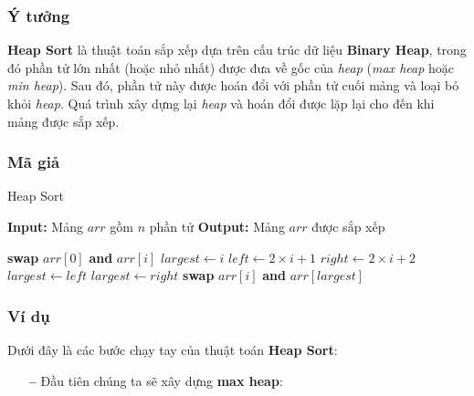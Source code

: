 \subsubsection{Ý tưởng}
\textbf{Heap Sort} là thuật toán sắp xếp dựa trên cấu trúc dữ liệu \textbf{Binary Heap}, trong đó phần tử lớn nhất (hoặc nhỏ nhất) được đưa về gốc của \textit{heap} (\textit{max heap} hoặc \textit{min heap}). Sau đó, phần tử này được hoán đổi với phần tử cuối mảng và loại bỏ khỏi \textit{heap}. Quá trình xây dựng lại \textit{heap} và hoán đổi được lặp lại cho đến khi mảng được sắp xếp.\cite{sharma2008analysis}

\subsubsection{Mã giả}
\begin{algorithm}[H]
\caption{Heap Sort}
\begin{algorithmic}[1]
    \State \textbf{Input:} Mảng $arr$ gồm $n$ phần tử
    \State \textbf{Output:} Mảng $arr$ được sắp xếp
    
        \State {}
    \EndFor
    
        \State \textbf{swap} $arr[0]$ \textbf{and} $arr[i]$
        \State {}
    \EndFor
\EndProcedure
{}
    \State $largest \gets i$
    \State $left \gets 2\times i + 1$
    \State $right \gets 2\times i + 2$
        \State $largest \gets left$
    \EndIf
        \State $largest \gets right$
    \EndIf
        \State \textbf{swap} $arr[i]$ \textbf{and} $arr[largest]$
        \State {}
    \EndIf
\EndProcedure
\end{algorithmic}
\end{algorithm}

\subsubsection{Ví dụ}
Dưới đây là các bước chạy tay của thuật toán \textbf{Heap Sort}:

\begin{itemize}
    \item [\textbf{--}] Đầu tiên chúng ta sẽ xây dựng \textbf{max heap}:
\end{itemize}


